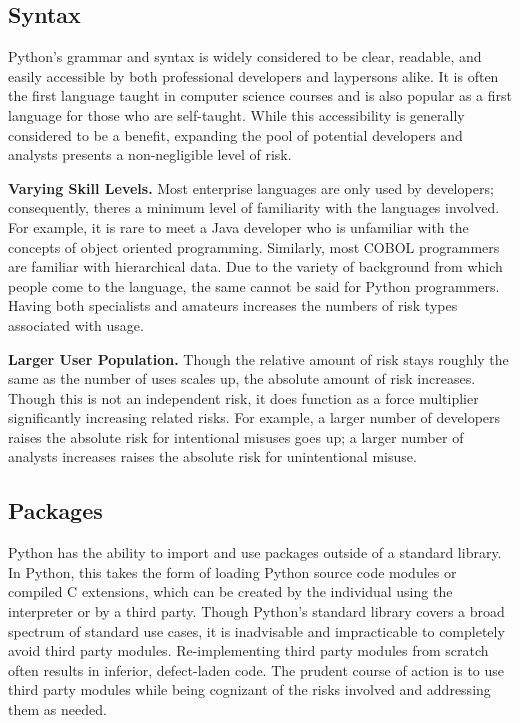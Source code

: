         \subsection{Syntax}

            Python's grammar and syntax is widely considered to be clear, readable, and easily accessible by both professional developers and laypersons alike. It is often the first language taught in computer science courses and is also popular as a first language for those who are self-taught. While this accessibility is generally considered to be a benefit, expanding the pool of potential developers and analysts presents a non-negligible level of risk. 

            \textbf{Varying Skill Levels.}
            Most enterprise languages are only used by developers; consequently, theres a minimum level of familiarity with the languages involved. For example, it is rare to meet a Java developer who is unfamiliar with the concepts of object oriented programming. Similarly, most COBOL programmers are familiar with hierarchical data. Due to the variety of background from which people come to the language, the same cannot be said for Python programmers. Having both specialists and amateurs increases the numbers of risk types associated with usage.

            \textbf{Larger User Population.}
            Though the relative amount of risk stays roughly the same as the number of uses scales up, the absolute amount of risk increases. Though this is not an independent risk, it does function as a force multiplier significantly increasing related risks. For example, a larger number of developers raises the absolute risk for intentional misuses goes up; a larger number of analysts increases raises the absolute risk for unintentional misuse.

        \subsection{Packages}

            Python has the ability to import and use packages outside of a standard library. In Python, this takes the form of loading Python source code modules or compiled C extensions, which can be created by the individual using the interpreter or by a third party. Though Python's standard library covers a broad spectrum of standard use cases, it is inadvisable and impracticable to completely avoid third party modules. Re-implementing third party modules from scratch often results in inferior, defect-laden code. The prudent course of action is to use third party modules while being cognizant of the risks involved and addressing them as needed.

